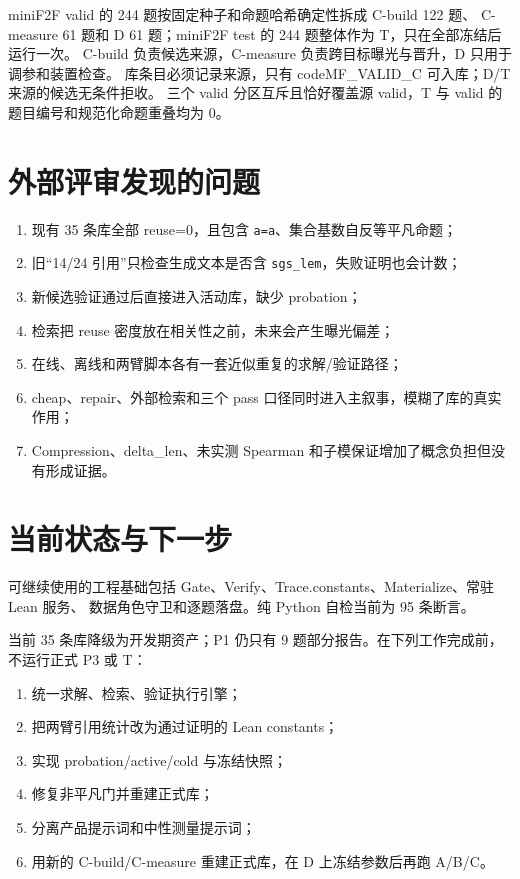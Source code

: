 \documentclass[UTF8,a4paper,11pt,fontset=windows]{ctexart}
\newcommand{\code}[1]{\texttt{\small #1}}
\begin{document}
miniF2F valid 的 244 题按固定种子和命题哈希确定性拆成 C-build 122 题、
C-measure 61 题和 D 61 题；miniF2F test 的 244 题整体作为 T，只在全部冻结后运行一次。
C-build 负责候选来源，C-measure 负责跨目标曝光与晋升，D 只用于调参和装置检查。
库条目必须记录来源，只有 code{MF\_VALID\_C} 可入库；D/T 来源的候选无条件拒收。
三个 valid 分区互斥且恰好覆盖源 valid，T 与 valid 的题目编号和规范化命题重叠均为 0。

\section{外部评审发现的问题}

\begin{enumerate}[leftmargin=1.8em,itemsep=4pt]
  \item 现有 35 条库全部 reuse=0，且包含 \code{a=a}、集合基数自反等平凡命题；
  \item 旧“14/24 引用”只检查生成文本是否含 \code{sgs\_lem}，失败证明也会计数；
  \item 新候选验证通过后直接进入活动库，缺少 probation；
  \item 检索把 reuse 密度放在相关性之前，未来会产生曝光偏差；
  \item 在线、离线和两臂脚本各有一套近似重复的求解/验证路径；
  \item cheap、repair、外部检索和三个 pass 口径同时进入主叙事，模糊了库的真实作用；
  \item Compression、delta\_len、未实测 Spearman 和子模保证增加了概念负担但没有形成证据。
\end{enumerate}

\section{当前状态与下一步}

可继续使用的工程基础包括 Gate、Verify、Trace.constants、Materialize、常驻 Lean 服务、
数据角色守卫和逐题落盘。纯 Python 自检当前为 95 条断言。

当前 35 条库降级为开发期资产；P1 仍只有 9 题部分报告。在下列工作完成前，不运行正式 P3 或 T：

\begin{enumerate}[leftmargin=1.8em,itemsep=3pt]
  \item 统一求解、检索、验证执行引擎；
  \item 把两臂引用统计改为通过证明的 Lean constants；
  \item 实现 probation/active/cold 与冻结快照；
  \item 修复非平凡门并重建正式库；
  \item 分离产品提示词和中性测量提示词；
  \item 用新的 C-build/C-measure 重建正式库，在 D 上冻结参数后再跑 A/B/C。
\end{enumerate}
\end{document}
